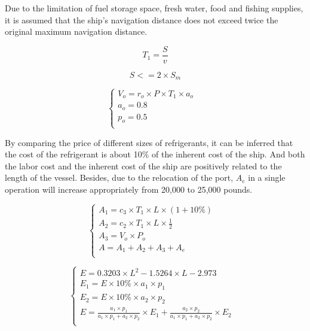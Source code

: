 \documentclass{mcmthesis}
\begin{document}
Due to the limitation of fuel storage space, fresh water, food and fishing supplies, it is assumed that the ship's navigation distance does not exceed twice the original maximum navigation distance.

\begin{equation}\label{4}
T_1=\frac{S}{v}
\end{equation}

\begin{equation}\label{4}
S<=2\times S_m
\end{equation}

\begin{equation}
\left\{
\begin{array}{lr}
V_o=r_o \times P \times T_1 \times a_o &\\
a_o=0.8  & \\    p_o=0.5 \\
\end{array}
\right.
\end{equation}

By comparing the price of different sizes of refrigerants, it can be inferred that the cost of the refrigerant is about 10\% of the inherent cost of the ship. And both the labor cost and the inherent cost of the ship are positively related to the length of the vessel. Besides, due to the relocation of the port, $A_e$ in a single operation will increase appropriately from 20,000 to 25,000 pounds.

			\begin{equation}
			\left\{
			\begin{array}{lr}

A_1=c_3 \times T_1\times L \times (1+10\%) &\\
A_2=c_2  \times T_1 \times L \times  \frac{1}{2} &\\
A_3=V_o  \times P_o &\\
A=A_1+A_2+A_3+A_e \\		
			\end{array}
			\right.
			\end{equation}



\begin{equation}
\left\{
\begin{array}{lr}
E= 0.3203\times L^2 -1.5264\times L -  2.973&\\
E_1=E \times 10\% \times a_1 \times p_1 &\\
E_2=E\times 10\% \times a_2 \times p_2 &\\
E= \frac{a_1 \times p_1}{a_1 \times p_1+ a_2 \times p_2} \times E_1 + \frac{a_2 \times p_2}{a_1 \times p_1+ a_2 \times p_2} \times E_2\\

\end{array}
\right.
\end{equation}
\end{document}

